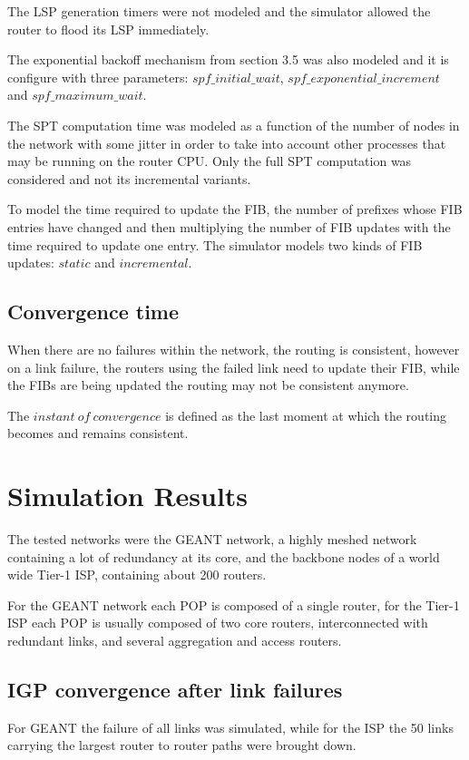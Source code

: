 \documentclass[a4paper, 11pt, UTF8]{article}
\begin{document}
The LSP generation timers were not modeled and the simulator allowed the router to flood its LSP immediately.

The exponential backoff mechanism from section 3.5 was also modeled and it is configure with three parameters: $spf\_initial\_wait$, $spf\_exponential\_increment$ and $spf\_maximum\_wait$.

The SPT computation time was modeled as a function of the number of nodes in the network with some jitter in order to take into account other processes that may be running on the router CPU.
Only the full SPT computation was considered and not its incremental variants.

To model the time required to update the FIB, 
the number of prefixes whose FIB entries have changed and then multiplying the number of FIB updates with the time required to update one entry.
The simulator models two kinds of FIB updates: $static$ and $incremental$.

\subsection{Convergence time}
When there are no failures within the network, the routing is consistent, however on a link failure, the routers using the failed link need to update their FIB, while the FIBs are being updated the routing may not be consistent anymore.

The $instant\ of\ convergence$ is defined as the last moment at which the routing becomes and remains consistent.

\section{Simulation Results}
The tested networks were the GEANT network, a highly meshed network containing a lot of redundancy at its core, 
and the backbone nodes of a world wide Tier-1 ISP, containing about 200 routers.

For the GEANT network each POP is composed of a single router, for the Tier-1 ISP each POP is usually composed of two core routers, interconnected with redundant links, and several aggregation and access routers.

\subsection{IGP convergence after link failures}
For GEANT the failure of all links was simulated, 
while for the ISP the 50 links carrying the largest router to router paths were brought down.
\end{document}
